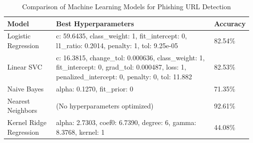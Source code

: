 \documentclass{article}
\begin{document}
    \begin{table}[h]
        \centering
        \begin{tabular}{|l|p{8cm}|l|}
            \hline
            \textbf{Model}          & \textbf{Best Hyperparameters}                                                                                                                          & \textbf{Accuracy} \\ \hline
            Logistic Regression     & c: 59.6435, class\_weight: 1, fit\_intercept: 0, l1\_ratio: 0.2014, penalty: 1, tol: 9.25e-05 & 82.54\% \\ \hline
            Linear SVC              & c: 16.3815, change\_tol: 0.000636, class\_weight: 1, fit\_intercept: 0, grad\_tol: 0.000487, loss: 1, penalized\_intercept: 0, penalty: 0, tol: 11.882 & 82.53\% \\ \hline
            Naive Bayes             & alpha: 0.1270, fit\_prior: 0                                                                                                                           & 71.35\%           \\ \hline
            Nearest Neighbors       & (No hyperparameters optimized)                                                                                                                         & 92.61\%           \\ \hline %
            Kernel Ridge Regression & alpha: 2.7303, coef0: 6.7390, degree: 6, gamma: 8.3768, kernel: 1 & 44.08\% \\ \hline
        \end{tabular}
        \caption{Comparison of Machine Learning Models for Phishing URL Detection}
        \label{tab:model_comparison}
    \end{table}

\end{document}
